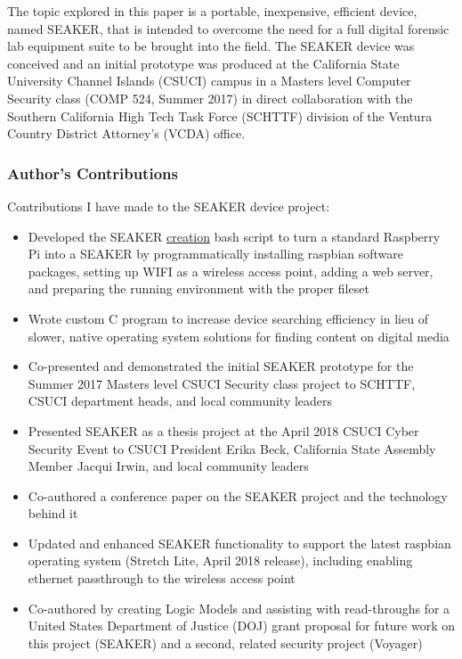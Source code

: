 \documentclass[12pt]{article}
\begin{document}
The topic explored in this paper is a portable, inexpensive, efficient device, named SEAKER,
that is intended
to overcome the need for a full digital
forensic lab equipment suite to be brought into the field.  The SEAKER device was conceived and 
an initial prototype was produced at the California State University Channel Islands (CSUCI)
campus in a 
Masters level Computer Security class (COMP 524, Summer 2017) in direct collaboration with the
Southern California High Tech Task Force (SCHTTF) division of the Ventura Country
District Attorney's (VCDA) office.\\


\subsubsection{Author's Contributions}
Contributions I have made to the SEAKER device project:
\begin{itemize}
  \item Developed the SEAKER \underline{creation} bash script to turn a standard Raspberry Pi into a
  SEAKER by programmatically
  installing raspbian software packages, setting up WIFI as a wireless access point, adding a web server,
  and preparing the running environment with the proper fileset
  \item Wrote custom C program to increase device searching efficiency in lieu of slower, native operating
  system solutions for finding content on digital media
  \item Co-presented and demonstrated the initial SEAKER prototype for the Summer 2017 Masters level CSUCI
  Security class project to SCHTTF, CSUCI department heads, and local community leaders
  \item Presented SEAKER as a thesis project at the April 2018 CSUCI Cyber Security Event to CSUCI President
  Erika Beck, California State Assembly Member Jacqui Irwin, and local community leaders
  \item Co-authored a conference paper on the SEAKER project and the technology behind it
  \item Updated and enhanced SEAKER functionality to support the latest raspbian operating system (Stretch
  Lite, April 2018 release), including enabling ethernet passthrough to the wireless access point
  \item Co-authored by creating Logic Models and assisting with read-throughs for a United States
  Department of Justice (DOJ)
  grant proposal for future work on this project (SEAKER) and
  a second, related security project (Voyager)
\end{itemize}
\end{document}
